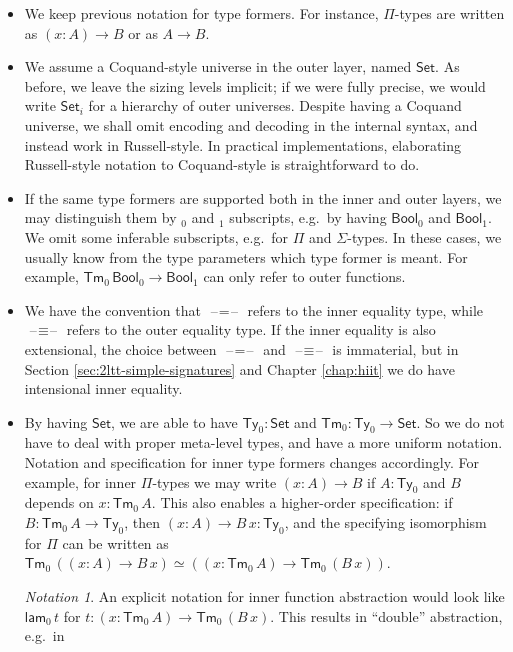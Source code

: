 \documentclass[12pt,a4paper,twoside,openany]{book}
\theoremstyle{remark}
\newtheorem{notation}{Notation}
\theoremstyle{definition}
\theoremstyle{theorem}
\newcommand{\ms}[1]{\mathsf{#1}}
\newcommand{\Tm}{\mathsf{Tm}}
\newcommand{\Ty}{\mathsf{Ty}}
\newcommand{\blank}{\mathord{\hspace{1pt}\text{--}\hspace{1pt}}}
\newcommand{\Set}{\mathsf{Set}}
\newcommand{\Bool}{\ms{Bool}}
\newcommand{\lam}{\ms{lam}}
\begin{document}
\begin{itemize}
  \item
    We keep previous notation for type formers. For instance, $\Pi$-types are
    written as $(x : A) \to B$ or as $A \to B$.
  \item
    We assume a Coquand-style universe in the outer layer, named $\Set$. As
    before, we leave the sizing levels implicit; if we were fully precise, we
    would write $\Set_i$ for a hierarchy of outer universes. Despite having a
    Coquand universe, we shall omit encoding and decoding in the internal
    syntax, and instead work in Russell-style. In practical implementations,
    elaborating Russell-style notation to Coquand-style is straightforward to
    do.
  \item
    If the same type formers are supported both in the inner and outer layers, we
    may distinguish them by $_0$ and $_1$ subscripts, e.g.\ by having $\Bool_0$ and
    $\Bool_1$. We omit some inferable subscripts, e.g.\ for $\Pi$ and
    $\Sigma$-types. In these cases, we usually know from the type parameters which
    type former is meant. For example, $\Tm_0\,\Bool_0 \to \Bool_1$ can only refer
    to outer functions.
  \item
    We have the convention that $\blank\!=\!\blank$ refers to the inner equality
    type, while $\blank\!\equiv\!\blank$ refers to the outer equality type. If
    the inner equality is also extensional, the choice between
    $\blank\!=\!\blank$ and $\blank\!\equiv\!\blank$ is immaterial, but in
    Section \ref{sec:2ltt-simple-signatures} and Chapter \ref{chap:hiit} we do
    have intensional inner equality.
  \item
    By having $\Set$, we are able to have $\Ty_0 : \Set$ and $\Tm_0 : \Ty_0 \to
    \Set$. So we do not have to deal with proper meta-level types, and have a
    more uniform notation. Notation and specification for inner type formers
    changes accordingly. For example, for inner $\Pi$-types we may write $(x :
    A) \to B$ if $A : \Ty_0$ and $B$ depends on $x : \Tm_0\,A$. This also
    enables a higher-order specification: if $B : \Tm_0\,A \to \Ty_0$, then $(x
    : A) \to B\,x : \Ty_0$, and the specifying isomorphism for $\Pi$ can be
    written as $\Tm_0\,((x : A) \to B\,x) \simeq ((x : \Tm_0\,A) \to
    \Tm_0\,(B\,x))$.
    \begin{notation}
      An explicit notation for inner function abstraction would look like
      $\lam_0\,t$ for $t : (x : \Tm_0\,A) \to \Tm_0\,(B\,x)$. This results in
      ``double'' abstraction, e.g.\ in

\end{notation}
\end{itemize}
\end{document}
